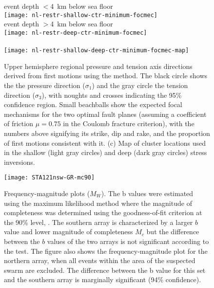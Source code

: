 \documentclass[reviewcopy]{elsart}
\renewcommand{\includegraphics}[2][]{\fbox{#2}}
\begin{document}
\begin{figure}
\begin{center}
{ event depth $<$4~km below sea floor}\\
\texttt{[image: nl-restr-shallow-ctr-minimum-focmec]}
\\
{ event depth $>$4~km below sea floor}\\
\texttt{[image: nl-restr-deep-ctr-minimum-focmec]}
\\
{ }\\
\texttt{[image: nl-restr-shallow-deep-ctr-minimum-focmec-map]}
\end{center}

\caption{Upper hemisphere regional pressure and tension axis
  directions derived from first motions using the \citet{robinson00}
  method. The black circle shows the the pressure direction
  ($\sigma_1$) and the gray circle the tension direction ($\sigma_3$), with noughts and
  crosses indicating the 95\% confidence region. Small beachballs show
 the expected focal mechanisms for the two optimal fault planes
 (assuming a coefficient of friction $\mu=0.75$ in the Coulomb
 fracture criterion), with the numbers above signifying its strike, dip and rake, and the proportion of first motions consistent with
it. (c) Map of cluster locations used in  the shallow (light gray
circles) and deep (dark gray circles) stress inversions.}
\label{fig:focmec}
\end{figure}



\begin{figure}
\centering
\texttt{[image: STA121nsw-GR-mc90]}
\caption{Frequency-magnitude plots ($M_W$). The b values were estimated using the maximum
likelihood method \citep{aki65} where the magnitude of completeness
was determined using the goodness-of-fit criterion at the 90\% level,
 \citep{wiemer02}.  The southern array is characterized by a larger
 $b$ value and lower magnitude of completeness $M_c$ but the
 difference between the $b$ values of the two arrays is not significant according to the
 \citet{utsu92} test. The figure also shows the frequency-magnitude
 plot for the northern array, when all events within the area of the
 suspected swarm are excluded.  The difference between the b value for
 this set and the southern array is marginally significant (94\%
 confidence).}

 
\label{fig:freq-mag}
\end{figure}
\end{document}
